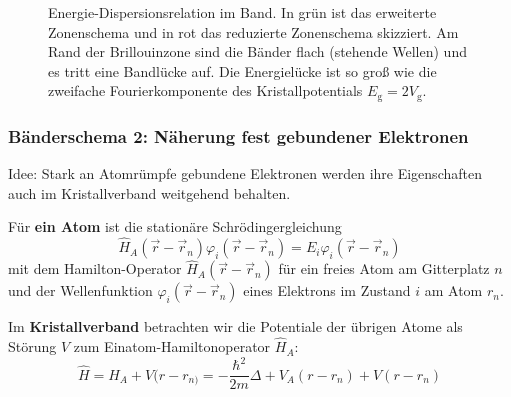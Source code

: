 \begin{figure}[H]
    \centering
	\caption{Energie-Dispersionsrelation im Band. 
		In grün ist das erweiterte Zonenschema und in rot das reduzierte Zonenschema skizziert.
		Am Rand der Brillouinzone sind die Bänder flach (stehende Wellen) und es tritt eine Bandlücke auf.
		Die Energielücke ist so groß wie die zweifache Fourierkomponente des Kristallpotentials $E_\mathrm g = 2V_\mathrm g$.
	}
    \label{fig:vl27_abbildung_3}
\end{figure}

\subsubsection{Bänderschema 2: Näherung fest gebundener Elektronen}
Idee: Stark an Atomrümpfe gebundene Elektronen werden ihre Eigenschaften auch im Kristallverband weitgehend behalten.

Für \textbf{ein Atom} ist die stationäre Schrödingergleichung
$$
\hat{H}_{A}(\Vec{r} -\Vec{r}_{n}) \varphi_{i} (\Vec{r}-\Vec{r}_{n}) = E_{i} \varphi_{i}(\Vec{r}-\Vec{r}_{n}) 
$$ 
mit dem Hamilton-Operator $\hat{H}_{A}(\Vec{r}- \Vec{r}_{n})$ für ein freies Atom am Gitterplatz $n$ und der Wellenfunktion $\varphi_{i}(\Vec{r}-\Vec{r}_{n})$ eines Elektrons im Zustand $i$ am Atom $r_{n}$.

Im \textbf{Kristallverband} betrachten wir die Potentiale der übrigen Atome als Störung $V$ zum Einatom-Hamiltonoperator $\hat{H}_{A}$:
$$
\hat{H} = \hat{H}_{A} + V(r-r_{n)} = - \frac{\hbar^2}{2m} \Delta + V_{A} (r-r_{n}) + V(r-r_{n})
$$ 
